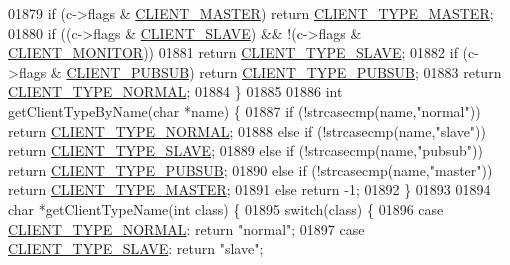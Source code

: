 \begin{DoxyCode}
{{{{{{{{{{{{{{{{{{{{01879     \textcolor{keywordflow}{if} (c->flags & \hyperlink{server_8h_a3d8f0cc8d0653ee2b6dafb454292c069}{CLIENT\_MASTER}) \textcolor{keywordflow}{return} \hyperlink{server_8h_ae96c04932d9a47108994d8f337fd8563}{CLIENT\_TYPE\_MASTER};
01880     \textcolor{keywordflow}{if} ((c->flags & \hyperlink{server_8h_ae9f6995948253652bc9454d79a72f4a7}{CLIENT\_SLAVE}) && !(c->flags & 
      \hyperlink{server_8h_a7724350e4f0ddbf1c80740699fac78be}{CLIENT\_MONITOR}))
01881         \textcolor{keywordflow}{return} \hyperlink{server_8h_a406b5d22cf6437efe61ae25156471b49}{CLIENT\_TYPE\_SLAVE};
01882     \textcolor{keywordflow}{if} (c->flags & \hyperlink{server_8h_a20f2f5380db97cd09013118ffc9411cc}{CLIENT\_PUBSUB}) \textcolor{keywordflow}{return} \hyperlink{server_8h_a2376a35dc691e54127260d5cd818f7dd}{CLIENT\_TYPE\_PUBSUB};
01883     \textcolor{keywordflow}{return} \hyperlink{server_8h_abd88c3450a5175a5c4a766741f361d5b}{CLIENT\_TYPE\_NORMAL};
01884 \}
01885 
01886 \textcolor{keywordtype}{int} getClientTypeByName(\textcolor{keywordtype}{char} *name) \{
01887     \textcolor{keywordflow}{if} (!strcasecmp(name,\textcolor{stringliteral}{"normal"})) \textcolor{keywordflow}{return} \hyperlink{server_8h_abd88c3450a5175a5c4a766741f361d5b}{CLIENT\_TYPE\_NORMAL};
01888     \textcolor{keywordflow}{else} \textcolor{keywordflow}{if} (!strcasecmp(name,\textcolor{stringliteral}{"slave"})) \textcolor{keywordflow}{return} \hyperlink{server_8h_a406b5d22cf6437efe61ae25156471b49}{CLIENT\_TYPE\_SLAVE};
01889     \textcolor{keywordflow}{else} \textcolor{keywordflow}{if} (!strcasecmp(name,\textcolor{stringliteral}{"pubsub"})) \textcolor{keywordflow}{return} \hyperlink{server_8h_a2376a35dc691e54127260d5cd818f7dd}{CLIENT\_TYPE\_PUBSUB};
01890     \textcolor{keywordflow}{else} \textcolor{keywordflow}{if} (!strcasecmp(name,\textcolor{stringliteral}{"master"})) \textcolor{keywordflow}{return} \hyperlink{server_8h_ae96c04932d9a47108994d8f337fd8563}{CLIENT\_TYPE\_MASTER};
01891     \textcolor{keywordflow}{else} \textcolor{keywordflow}{return} -1;
01892 \}
01893 
01894 \textcolor{keywordtype}{char} *getClientTypeName(\textcolor{keywordtype}{int} \textcolor{keyword}{class}) \{
01895     \textcolor{keywordflow}{switch}(\textcolor{keyword}{class}) \{
01896     \textcolor{keywordflow}{case} \hyperlink{server_8h_abd88c3450a5175a5c4a766741f361d5b}{CLIENT\_TYPE\_NORMAL}: \textcolor{keywordflow}{return} \textcolor{stringliteral}{"normal"};
01897     \textcolor{keywordflow}{case} \hyperlink{server_8h_a406b5d22cf6437efe61ae25156471b49}{CLIENT\_TYPE\_SLAVE}:  \textcolor{keywordflow}{return} \textcolor{stringliteral}{"slave"};
}}}}}}}}}}}}}}}}}}}}
\end{DoxyCode}
